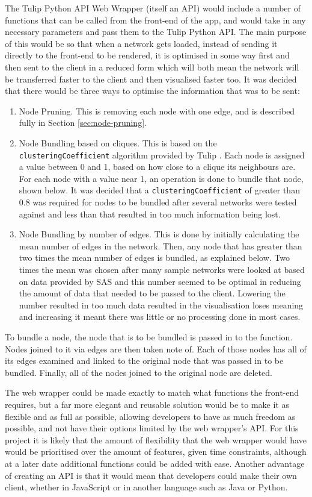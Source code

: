 \documentclass[../dissertation.tex]{subfiles}
\begin{document}
The Tulip Python API Web Wrapper (itself an API) would include a number of functions that can be called from the front-end of the app, and would take in any necessary parameters and pass them to the Tulip Python API. The main purpose of this would be so that when a network gets loaded, instead of sending it directly to the front-end to be rendered, it is optimised in some way first and then sent to the client in a reduced form which will both mean the network will be transferred faster to the client and then visualised faster too. It was decided that there would be three ways to optimise the information that was to be sent:
\begin{enumerate}
    \item Node Pruning. This is removing each node with one edge, and is described fully in Section \ref{sec:node-pruning}.
    \item Node Bundling based on cliques. This is based on the \texttt{clusteringCoefficient} algorithm provided by Tulip \cite{tulip-clustering-coeff-doc}. Each node is assigned a value between 0 and 1, based on how close to a clique its neighbours are. For each node with a value near 1, an operation is done to bundle that node, shown below. It was decided that a \texttt{clusteringCoefficient} of greater than 0.8 was required for nodes to be bundled after several networks were tested against and less than that resulted in too much information being lost.
    \item Node Bundling by number of edges. This is done by initially calculating the mean number of edges in the network. Then, any node that has greater than two times the mean number of edges is bundled, as explained below. Two times the mean was chosen after many sample networks were looked at based on data provided by SAS and this number seemed to be optimal in reducing the amount of data that needed to be passed to the client. Lowering the number resulted in too much data resulted in the visualisation loses meaning and increasing it meant there was little or no processing done in most cases.
\end{enumerate}

To bundle a node, the node that is to be bundled is passed in to the function. Nodes joined to it via edges are then taken note of. Each of those nodes has all of its edges examined and linked to the original node that was passed in to be bundled. Finally, all of the nodes joined to the original node are deleted.

The web wrapper could be made exactly to match what functions the front-end requires, but a far more elegant and reusable solution would be to make it as flexible and as full as possible, allowing developers to have as much freedom as possible, and not have their options limited by the web wrapper's API. For this project it is likely that the amount of flexibility that the web wrapper would have would be prioritised over the amount of features, given time constraints, although at a later date additional functions could be added with ease. Another advantage of creating an API is that it would mean that developers could make their own client, whether in JavaScript or in another language such as Java or Python.
\end{document}
